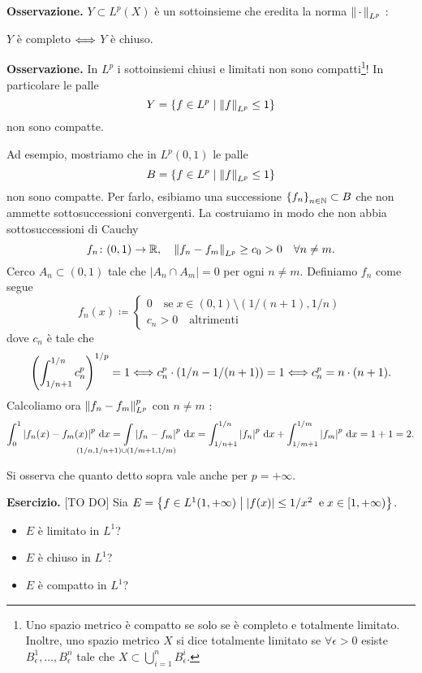 \textbf{Osservazione.} $Y \subset L^p(X)$ è un sottoinsieme che eredita la norma $\left\lVert \,\cdot\, \right\rVert_{L^p}$ :
\begin{center}
$Y$ è completo $\Longleftrightarrow$ $Y$ è chiuso.
\end{center}

\textbf{Osservazione.} In $L^p$ i sottoinsiemi chiusi e limitati non sono compatti\footnote{Uno spazio metrico è compatto se solo se è completo e totalmente limitato. Inoltre, uno spazio metrico $X$ si dice totalmente limitato se $\forall \epsilon > 0$ esiste $B_\epsilon^1,\ldots,B_\epsilon^n$ tale che $X \subset \bigcup_{i=1}^n B_\epsilon^i$.}!
In particolare le palle
%
$$
Y = \left\{ f \in L^p \;\middle|\; \left\lVert f \right\rVert_{L^p} \leq 1 \right\}
$$
%
non sono compatte.

Ad esempio, mostriamo che in $L^p(0,1)$ le palle 
%
$$
B = \left\{ f \in L^p \;\middle|\; \left\lVert f \right\rVert_{L^p} \leq 1 \right\}
$$
%
non sono compatte.
Per farlo, esibiamo una successione $\left\{ f_n \right\}_{n \in \mathbb N} \subset B$ che non ammette sottosuccessioni convergenti.
La costruiamo in modo che non abbia sottosuccessioni di Cauchy
%
$$
	f_n \colon (0,1) \to \mathbb R, \quad \left\lVert f_n - f_m \right\rVert_{L^p} \geq c_0 > 0 \quad  \forall n \neq m.
$$
%
Cerco $A_n \subset (0,1)$ tale che $\left| A_n \cap A_m \right| = 0$ per ogni $n \neq m$.
Definiamo $f_n$ come segue
%
$$
f_n(x) \coloneqq 
	\begin{cases}
		0 \quad  \text{se} \; x \in (0,1) \setminus (1 / (n+1), 1/ n) \\
		c_n > 0 \quad \text{altrimenti}
	\end{cases} 
$$
%
dove $c_n$ è tale che 
%
$$
\left( \int_{1 / n+1}^{1 / n} c_n^p  \right)^{1/p} = 1 \Longleftrightarrow 
	c_n^p \cdot (1/n - 1/(n+1)) = 1 \Longleftrightarrow c_n^p = n \cdot (n+1).
$$
%
Calcoliamo ora $\left\lVert f_n - f_m \right\rVert^p_{L^p}$ con $n \neq m$ :
%
$$
	\int_0^1 \left| f_n(x) - f_m(x) \right|^p \dd x = \int\limits_{\mathclap{(1/n,1/n+1) \cup (1/ m+1,1/m)}} \left| f_n - f_m \right|^p \dd x = \int_{1 / n+1}^{1 / n} \left| f_n \right|^p \dd x + \int_{1/m+1}^{1/m} \left| f_m \right|^p \dd x = 1 + 1 = 2.
$$
%

Si osserva che quanto detto sopra vale anche per $p = + \infty$.

\textbf{Esercizio.} [TO DO] Sia $E = \left\{ f \in L^1(1,+\infty) \;\middle|\; \left| f(x) \right| \leq 1 / x^2 \;\; \text{e} \;x \in [1,+\infty) \right\}$.

\begin{itemize}

\item $E$ è limitato in $L^1$?

\item $E$ è chiuso in $L^1$?

\item $E$ è compatto in $L^1$?

\end{itemize}

